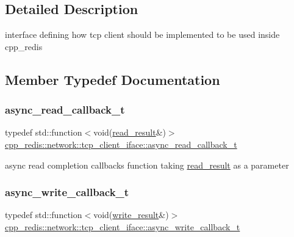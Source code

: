 \subsection{Detailed Description}
interface defining how tcp client should be implemented to be used inside cpp\+\_\+redis 

\subsection{Member Typedef Documentation}
\mbox{\label{classcpp__redis_1_1network_1_1tcp__client__iface_ae8bf79e8e1f1d7e359ed1c7cdc4026fc}} 
\subsubsection{\texorpdfstring{async\+\_\+read\+\_\+callback\+\_\+t}{async\_read\_callback\_t}}
{\footnotesize\ttfamily typedef std\+::function$<$void(\hyperlink{structcpp__redis_1_1network_1_1tcp__client__iface_1_1read__result}{read\+\_\+result}\&)$>$ \hyperlink{classcpp__redis_1_1network_1_1tcp__client__iface_ae8bf79e8e1f1d7e359ed1c7cdc4026fc}{cpp\+\_\+redis\+::network\+::tcp\+\_\+client\+\_\+iface\+::async\+\_\+read\+\_\+callback\+\_\+t}}

async read completion callbacks function taking \hyperlink{structcpp__redis_1_1network_1_1tcp__client__iface_1_1read__result}{read\+\_\+result} as a parameter \mbox{\label{classcpp__redis_1_1network_1_1tcp__client__iface_a1dc52ccc70cf377c4fbb495a16adc658}} 
\subsubsection{\texorpdfstring{async\+\_\+write\+\_\+callback\+\_\+t}{async\_write\_callback\_t}}
{\footnotesize\ttfamily typedef std\+::function$<$void(\hyperlink{structcpp__redis_1_1network_1_1tcp__client__iface_1_1write__result}{write\+\_\+result}\&)$>$ \hyperlink{classcpp__redis_1_1network_1_1tcp__client__iface_a1dc52ccc70cf377c4fbb495a16adc658}{cpp\+\_\+redis\+::network\+::tcp\+\_\+client\+\_\+iface\+::async\+\_\+write\+\_\+callback\+\_\+t}}

